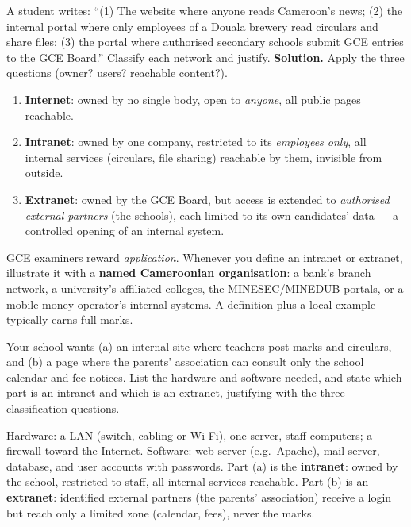\documentclass[11pt]{article}
\begin{document}
\begin{exoresolu}
A student writes: ``(1) The website where anyone reads Cameroon's news; (2) the internal portal where only employees of a Douala brewery read circulars and share files; (3) the portal where authorised secondary schools submit GCE entries to the GCE Board.'' Classify each network and justify.
\tcblower
\textbf{Solution.} Apply the three questions (owner? users? reachable content?).
\begin{enumerate}
\item \textbf{Internet}: owned by no single body, open to \emph{anyone}, all public pages reachable.
\item \textbf{Intranet}: owned by one company, restricted to its \emph{employees only}, all internal services (circulars, file sharing) reachable by them, invisible from outside.
\item \textbf{Extranet}: owned by the GCE Board, but access is extended to \emph{authorised external partners} (the schools), each limited to its own candidates' data --- a controlled opening of an internal system.
\end{enumerate}
\end{exoresolu}

\begin{savaistu}
GCE examiners reward \emph{application}. Whenever you define an intranet or extranet, illustrate it with a \textbf{named Cameroonian organisation}: a bank's branch network, a university's affiliated colleges, the MINESEC/MINEDUB portals, or a mobile-money operator's internal systems. A definition plus a local example typically earns full marks.
\end{savaistu}

\begin{exercice}
Your school wants (a) an internal site where teachers post marks and circulars, and (b) a page where the parents' association can consult only the school calendar and fee notices. List the hardware and software needed, and state which part is an intranet and which is an extranet, justifying with the three classification questions.
\end{exercice}

\begin{corrige}[Exercise 1]
Hardware: a LAN (switch, cabling or Wi-Fi), one server, staff computers; a firewall toward the Internet. Software: web server (e.g.\ Apache), mail server, database, and user accounts with passwords. Part (a) is the \textbf{intranet}: owned by the school, restricted to staff, all internal services reachable. Part (b) is an \textbf{extranet}: identified external partners (the parents' association) receive a login but reach only a limited zone (calendar, fees), never the marks.
\end{corrige}
\end{document}
